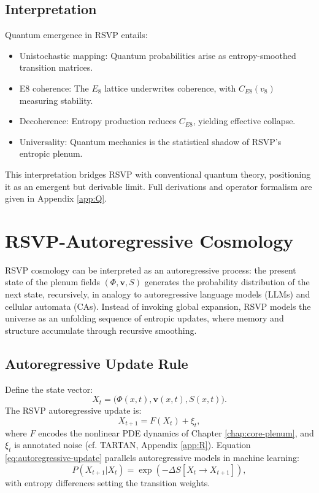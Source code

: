 \documentclass[12pt]{report}
\begin{document}
\section{Interpretation}
Quantum emergence in RSVP entails:
\begin{itemize}
    \item Unistochastic mapping: Quantum probabilities arise as entropy-smoothed transition matrices.
    \item E8 coherence: The \(E_8\) lattice underwrites coherence, with \(C_{E8}(v_8)\) measuring stability.
    \item Decoherence: Entropy production reduces \(C_{E8}\), yielding effective collapse.
    \item Universality: Quantum mechanics is the statistical shadow of RSVP’s entropic plenum.
\end{itemize}
This interpretation bridges RSVP with conventional quantum theory, positioning it as an emergent but derivable limit. Full derivations and operator formalism are given in Appendix \ref{app:Q}.

\chapter{RSVP-Autoregressive Cosmology}
\label{chap:autoregressive-cosmology}
RSVP cosmology can be interpreted as an autoregressive process: the present state of the plenum fields \((\Phi, \mathbf{v}, S)\) generates the probability distribution of the next state, recursively, in analogy to autoregressive language models (LLMs) and cellular automata (CAs). Instead of invoking global expansion, RSVP models the universe as an unfolding sequence of entropic updates, where memory and structure accumulate through recursive smoothing.

\section{Autoregressive Update Rule}
Define the state vector:
\[
X_t = \big(\Phi(x,t), \mathbf{v}(x,t), S(x,t)\big).
\]
The RSVP autoregressive update is:
\begin{equation}
X_{t+1} = F(X_t) + \xi_t, \label{eq:autoregressive-update}
\end{equation}
where \(F\) encodes the nonlinear PDE dynamics of Chapter \ref{chap:core-plenum}, and \(\xi_t\) is annotated noise (cf. TARTAN, Appendix \ref{app:R}). Equation \eqref{eq:autoregressive-update} parallels autoregressive models in machine learning:
\begin{equation}
P(X_{t+1}|X_t) = \exp\left(-\Delta S[X_t \to X_{t+1}]\right),
\end{equation}
with entropy differences setting the transition weights.
\end{document}
